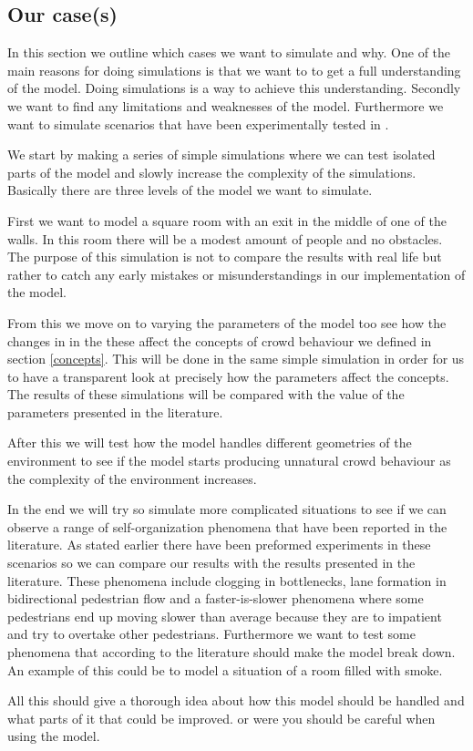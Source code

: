 \subsection{Our case(s)}\label{ourCases}
In this section we outline which cases we want to simulate and why.
One of the main reasons for doing simulations is that we want to to get 
a full understanding of the model. Doing simulations is a way to achieve this
understanding. Secondly we want to find any limitations and weaknesses of the 
model. Furthermore we want to simulate scenarios that have been experimentally 
tested in \citep{self-org}.

We start by making a series of simple simulations  where we can test isolated parts 
of the model and slowly increase the complexity of the simulations. Basically there 
are three levels of the model we want to simulate. 

First we want to model a square room with an exit in the middle of one of the walls. 
In this room there will be a modest amount of people and no obstacles. The purpose of 
this simulation is not to compare the results with real life but rather to catch any 
early mistakes or misunderstandings in our implementation of the model.

From this we move on to varying the parameters of the model too see how the changes in 
in the these affect the concepts of crowd behaviour we defined in section \ref{concepts}. 
This will be done in the same simple simulation in order for us to have a transparent look 
at precisely how the parameters affect the concepts. The results of these simulations 
will be compared with the value of the parameters presented in the literature.

After this we will test how the model handles different geometries of the environment 
to see if the model starts producing unnatural crowd behaviour as the complexity of the 
environment increases. 

In the end we will try so simulate more complicated situations to see if we can observe 
a range of self-organization phenomena that have been reported in the literature. As 
stated earlier there have been preformed experiments in these scenarios so we can 
compare our results with the results presented in the literature. These phenomena 
include clogging in bottlenecks, lane formation in bidirectional pedestrian 
flow and a faster-is-slower phenomena where some pedestrians end up moving slower than 
average because they are to impatient and try to overtake other pedestrians\cite{self-org}. 
Furthermore we want to test some phenomena  that according to the literature should make 
the model break down. An example of this could be to model a situation of a room filled 
with smoke.   

All this should give a thorough idea about how this model should be handled and what parts 
of it that could be improved. or were you should be careful when using the model.